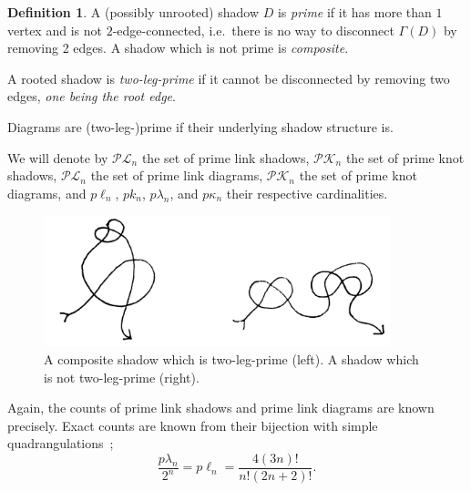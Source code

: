 \documentclass[amsmath,longbibliography,secnumarabic,floatfix,amssymb,nofootinbib,nobibnotes,letterpaper,11pt,tightenlines,notitlepage,showkeys,showlabels]{amsart}%
\newcommand{\PrimeLinkDia}{\mathcal{PL}}
\newcommand{\primelinkdia}{p\lambda}
\newcommand{\PrimeLinkShad}{\mathscr{PL}}
\newcommand{\primelinkshad}{p\ell}
\newcommand{\PrimeKnotDia}{\mathcal{PK}}
\newcommand{\primeknotdia}{p\kappa}
\newcommand{\PrimeKnotShad}{\mathscr{PK}}
\newcommand{\primeknotshad}{pk}
\newcommand{\GraphOf}[1]{\Gamma(#1)}
\newtheorem{proposition}[theorem]{Proposition}
\theoremstyle{definition}
\newtheorem*{definition}{Definition}
\begin{document}
\begin{definition}
  A (possibly unrooted) shadow $D$ is \emph{prime} if it has more than
  $1$ vertex and is not $2$-edge-connected, i.e.\ there is no way to
  disconnect $\GraphOf D$ by removing 2 edges. A shadow which is not
  prime is \emph{composite}.

  A rooted shadow is \emph{two-leg-prime} if it cannot
  be disconnected by removing two edges, \textit{one being the root
    edge}. 

  Diagrams are (two-leg-)prime if their underlying shadow
  structure is.
\end{definition}

We will denote by $\PrimeLinkShad_n$ the set of prime link shadows,
$\PrimeKnotShad_n$ the set of prime knot shadows,
$\PrimeLinkDia_n$ the set of prime link diagrams, $\PrimeKnotDia_n$
the set of prime knot diagrams, and
$\primelinkshad_n$, $\primeknotshad_n$, $\primelinkdia_n$, and $\primeknotdia_n$ their respective cardinalities.

\begin{figure}[h!]  \centering
  \includegraphics[height=1.5in]{2leg_vs_reg_prime}
  \caption{A composite shadow which is two-leg-prime (left). A shadow
    which is not two-leg-prime (right). }
  \label{fig:prime2legprime}
\end{figure}

Again, the counts of prime link shadows and prime link diagrams are
known precisely. Exact counts are known from their
bijection with simple quadrangulations~\cite{AlbenqueSQT};
\[ \frac{\primelinkdia_n}{2^n} = \primelinkshad_n = \frac{4(3n)!}{n!(2n + 2)!}.\]


\end{document}

